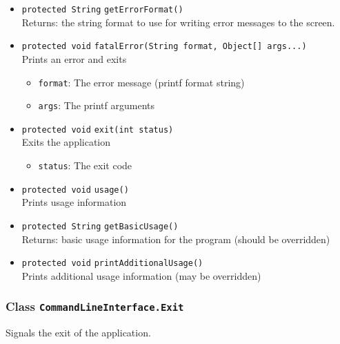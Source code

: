 \begin{itemize}
\item \lstinline|protected String| \lstinline|getErrorFormat|\lstinline|()|\\
Returns: the string format to use for writing error messages to the
 screen.



\item \lstinline|protected void| \lstinline|fatalError|\lstinline|(String format, Object[] args...)|\\
Prints an error and exits
\begin{itemize}
\item \lstinline|format|: The error message (printf format string)
\item \lstinline|args|: The printf arguments
\end{itemize}



\item \lstinline|protected void| \lstinline|exit|\lstinline|(int status)|\\
Exits the application
\begin{itemize}
\item \lstinline|status|: The exit code
\end{itemize}



\item \lstinline|protected void| \lstinline|usage|\lstinline|()|\\
Prints usage information



\item \lstinline|protected String| \lstinline|getBasicUsage|\lstinline|()|\\
Returns: basic usage information for the program (should be overridden)



\item \lstinline|protected void| \lstinline|printAdditionalUsage|\lstinline|()|\\
Prints additional usage information (may be overridden)



\end{itemize}

\subsubsection{Class \lstinline|CommandLineInterface.Exit|}
Signals the exit of the application. \\


